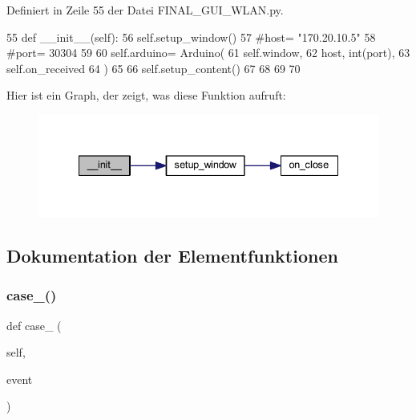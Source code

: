 Definiert in Zeile 55 der Datei F\+I\+N\+A\+L\+\_\+\+G\+U\+I\+\_\+\+W\+L\+A\+N.\+py.


\begin{DoxyCode}
55     \textcolor{keyword}{def }\_\_init\_\_(self):
56         self.setup\_window()
57         \textcolor{comment}{#host= "170.20.10.5"}
58         \textcolor{comment}{#port= 30304}
59 
60         self.arduino= Arduino(
61             self.window,
62             host, int(port),
63             self.on\_received
64         )
65 
66         self.setup\_content()
67 
68     
69     
70     
\end{DoxyCode}
Hier ist ein Graph, der zeigt, was diese Funktion aufruft\+:
\nopagebreak
\begin{figure}[H]
\begin{center}
\leavevmode
\includegraphics[width=335pt]{class_f_i_n_a_l___g_u_i___w_l_a_n_1_1_w_l_a_n_ae64f0875afe3067b97ba370b354b9213_cgraph}
\end{center}
\end{figure}


\subsection{Dokumentation der Elementfunktionen}
\mbox{\label{class_f_i_n_a_l___g_u_i___w_l_a_n_1_1_w_l_a_n_a56a0117dca51418bc547938098845f9c}} 
\subsubsection{\texorpdfstring{case\+\_()}{case\_1()}}
{\footnotesize\ttfamily def case\+\_ (\begin{DoxyParamCaption}\item[{}]{self,  }\item[{}]{event }\end{DoxyParamCaption})}




